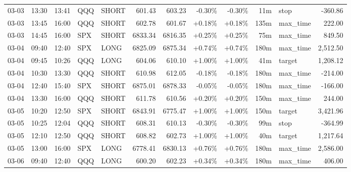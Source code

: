 \documentclass[11pt,a4paper,twoside]{article}
\begin{document}
\begin{center}
\begin{longtable}{>{\color{txtmain}}l l l l l r r r r r >{\color{txtmain}}l r}
03-03 & 13:30 & 13:41 & QQQ & SHORT & 601.43 & 603.23 & \textcolor{lossred}{-0.30\%} & \textcolor{lossred}{-0.30\%} & 11m & stop & \textcolor{lossred}{-360.86} \\
03-03 & 13:45 & 16:00 & QQQ & SHORT & 602.78 & 601.67 & \textcolor{wingreen}{+0.18\%} & \textcolor{wingreen}{+0.18\%} & 135m & max\_time & \textcolor{wingreen}{222.00} \\
03-03 & 14:45 & 16:00 & SPX & SHORT & 6833.34 & 6816.35 & \textcolor{wingreen}{+0.25\%} & \textcolor{wingreen}{+0.25\%} & 75m & max\_time & \textcolor{wingreen}{849.50} \\
03-04 & 09:40 & 12:40 & SPX & LONG & 6825.09 & 6875.34 & \textcolor{wingreen}{+0.74\%} & \textcolor{wingreen}{+0.74\%} & 180m & max\_time & \textcolor{wingreen}{2,512.50} \\
03-04 & 09:45 & 10:26 & QQQ & LONG & 604.06 & 610.10 & \textcolor{wingreen}{+1.00\%} & \textcolor{wingreen}{+1.00\%} & 41m & target & \textcolor{wingreen}{1,208.12} \\
03-04 & 10:30 & 13:30 & QQQ & SHORT & 610.98 & 612.05 & \textcolor{lossred}{-0.18\%} & \textcolor{lossred}{-0.18\%} & 180m & max\_time & \textcolor{lossred}{-214.00} \\
03-04 & 12:40 & 15:40 & SPX & SHORT & 6875.01 & 6878.33 & \textcolor{lossred}{-0.05\%} & \textcolor{lossred}{-0.05\%} & 180m & max\_time & \textcolor{lossred}{-166.00} \\
03-04 & 13:30 & 16:00 & QQQ & SHORT & 611.78 & 610.56 & \textcolor{wingreen}{+0.20\%} & \textcolor{wingreen}{+0.20\%} & 150m & max\_time & \textcolor{wingreen}{244.00} \\
03-05 & 10:20 & 12:50 & SPX & SHORT & 6843.91 & 6775.47 & \textcolor{wingreen}{+1.00\%} & \textcolor{wingreen}{+1.00\%} & 150m & target & \textcolor{wingreen}{3,421.96} \\
03-05 & 10:25 & 12:04 & QQQ & SHORT & 608.31 & 610.13 & \textcolor{lossred}{-0.30\%} & \textcolor{lossred}{-0.30\%} & 99m & stop & \textcolor{lossred}{-364.99} \\
03-05 & 12:10 & 12:50 & QQQ & SHORT & 608.82 & 602.73 & \textcolor{wingreen}{+1.00\%} & \textcolor{wingreen}{+1.00\%} & 40m & target & \textcolor{wingreen}{1,217.64} \\
03-05 & 13:00 & 16:00 & SPX & LONG & 6778.41 & 6830.13 & \textcolor{wingreen}{+0.76\%} & \textcolor{wingreen}{+0.76\%} & 180m & max\_time & \textcolor{wingreen}{2,586.00} \\
03-06 & 09:40 & 12:40 & QQQ & LONG & 600.20 & 602.23 & \textcolor{wingreen}{+0.34\%} & \textcolor{wingreen}{+0.34\%} & 180m & max\_time & \textcolor{wingreen}{406.00} \\

\end{longtable}
\end{center}
\end{document}
